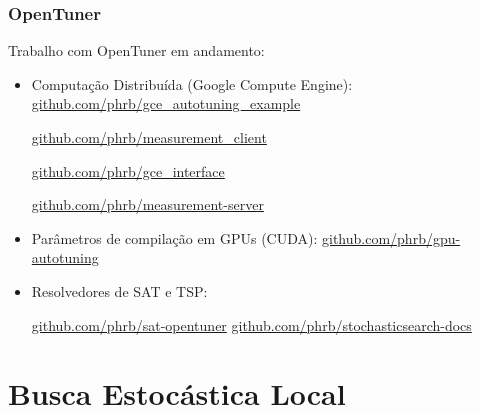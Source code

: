 \documentclass[10pt, compress]{beamer}
\begin{document}
\begin{frame}[fragile]
    \frametitle{OpenTuner}
    Trabalho com OpenTuner em andamento:
    \begin{itemize}
        \item Computação Distribuída (\alert{Google Compute Engine}):
            \url{github.com/phrb/gce\_autotuning\_example}

            \url{github.com/phrb/measurement\_client}

            \url{github.com/phrb/gce\_interface}

            \url{github.com/phrb/measurement-server}
        \item Parâmetros de compilação em GPUs (\alert{CUDA}):
            \url{github.com/phrb/gpu-autotuning}
        \item Resolvedores de \alert{SAT} e \alert{TSP}:

            \url{github.com/phrb/sat-opentuner}
            \url{github.com/phrb/stochasticsearch-docs}
    \end{itemize}
\end{frame}

\section{Busca Estocástica Local}
\end{document}
